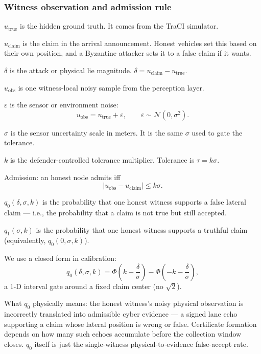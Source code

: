 \documentclass[letterpaper,10pt,conference]{IEEEtran}
\begin{document}
\subsubsection{Witness observation and admission rule}



\(u_{\text{true}}\) is the hidden ground truth. It comes from the TraCI simulator.

\(u_{\text{claim}}\) is the claim in the arrival announcement. Honest vehicles set this based on their own position, and a Byzantine attacker sets it to a false claim if it wants.

\(\delta\) is the attack or physical lie magnitude. \(\delta = u_{\text{claim}} - u_{\text{true}}\).

\(u_{\text{obs}}\) is one witness-local noisy sample from the perception layer.

\(\varepsilon\) is the sensor or environment noise:
\[
u_{\text{obs}} = u_{\text{true}} + \varepsilon, \qquad \varepsilon \sim \mathcal{N}(0,\sigma^2).
\]

\(\sigma\) is the sensor uncertainty scale in meters. It is the same \(\sigma\) used to gate the tolerance.

\(k\) is the defender-controlled tolerance multiplier. Tolerance is \(\tau = k\sigma\).

Admission: an honest node admits iff
\[
|u_{\text{obs}} - u_{\text{claim}}| \le k\sigma.
\]


\(q_0(\delta,\sigma,k)\) is the probability that one honest witness supports a false lateral claim — i.e., the probability that a claim is not true but still accepted.

\(q_1(\sigma,k)\) is the probability that one honest witness supports a truthful claim (equivalently, \(q_0(0,\sigma,k)\)).

We use a closed form in calibration:
\[
q_0(\delta,\sigma,k) = \Phi\!\left(k - \frac{\delta}{\sigma}\right) - \Phi\!\left(-k - \frac{\delta}{\sigma}\right),
\]
a 1-D interval gate around a fixed claim center (no \(\sqrt{2}\)).

What \(q_0\) physically means: the honest witness’s noisy physical observation is incorrectly translated into admissible cyber evidence — a signed lane echo supporting a claim whose lateral position is wrong or false. Certificate formation depends on how many such echoes accumulate before the collection window closes. \(q_0\) itself is just the single-witness physical-to-evidence false-accept rate.
\end{document}

